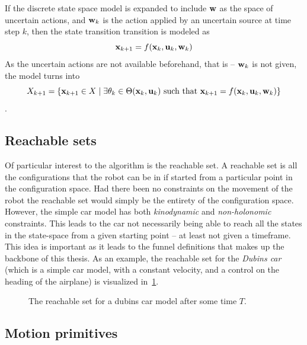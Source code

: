 If the discrete state space model is expanded to include \(\mathbf{w}\) as the
space of uncertain actions, and \(\mathbf{w}_k\) is the action applied by an
uncertain source at time step \(k\), then the state transition transition is
modeled as
\[
  \mathbf{x}_{k+1} = f(\mathbf{x}_k,\mathbf{u}_k,\mathbf{w}_k)
\]
As the uncertain actions are not available beforehand, that is -- \(\mathbf{w}_
k\) is not given, the model turns into
\[
  X_{k+1} = \lbrace \mathbf{x}_{k+1} \in X \mid \exists\theta_k \in
    \Theta(\mathbf{x}_k,\mathbf{u}_k) \text{ such that } \mathbf{x}_{k+1} =
    f(\mathbf{x}_k,\mathbf{u}_k,\mathbf{w}_k)\rbrace
\] \cite{Lav06}.

\subsection{Reachable sets}
\label{subsec:reachable-set}

Of particular interest to the \rrtfunnel{} algorithm is the reachable set. A
reachable set is all the configurations that the robot can be in if started from
a particular point in the configuration space. Had there been no constraints on
the movement of the robot the reachable set would simply be the entirety of the
configuration space. However, the simple car model has both \textit{kinodynamic}
and \textit{non-holonomic} constraints. This leads to the car not necessarily
being able to reach all the states in the state-space from a given starting
point -- at least not given a timeframe. This idea is important as it leads to
the funnel definitions that makes up the backbone of this thesis. As an example,
the reachable set for the \textit{Dubins car} (which is a simple car model, with
a constant velocity, and a control on the heading of the airplane) is visualized
in~\cref{fig:reachable-set-dubin}.

\begin{figure}
  \centering 
  \caption{The reachable set for a dubins car model after some time \(T\).}
  \label{fig:reachable-set-dubin}
\end{figure}

\subsection{Motion primitives}

